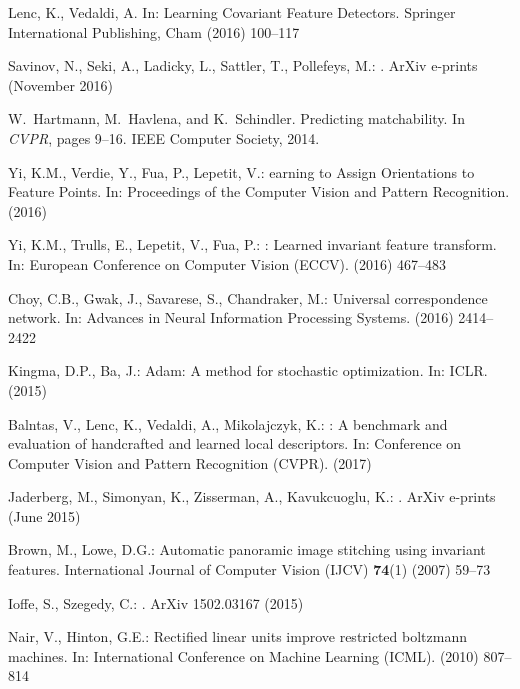 \documentclass[runningheads]{llncs}
\begin{document}
{\begin{thebibliography}{10}
Lenc, K., Vedaldi, A.
\newblock In: Learning Covariant Feature Detectors. Springer International
  Publishing, Cham (2016)  100--117

{Savinov}, N., {Seki}, A., {Ladicky}, L., {Sattler}, T., {Pollefeys}, M.:
.
\newblock ArXiv e-prints (November 2016)


W.~Hartmann, M.~Havlena, and K.~Schindler.
\newblock Predicting matchability.
\newblock In {\em CVPR}, pages 9--16. IEEE Computer Society, 2014.

Yi, K.M., Verdie, Y., Fua, P., Lepetit, V.:
earning to {A}ssign {O}rientations to {F}eature {P}oints.
\newblock In: Proceedings of the {C}omputer {V}ision and {P}attern
  {R}ecognition. (2016)

Yi, K.M., Trulls, E., Lepetit, V., Fua, P.:
: Learned invariant feature transform.
\newblock In: European Conference on Computer Vision ({ECCV}). (2016)  467--483

Choy, C.B., Gwak, J., Savarese, S., Chandraker, M.:
\newblock Universal correspondence network.
\newblock In: Advances in Neural Information Processing Systems. (2016)
  2414--2422

Kingma, D.P., Ba, J.:
\newblock Adam: {A} method for stochastic optimization.
\newblock In: ICLR. (2015)

Balntas, V., Lenc, K., Vedaldi, A., Mikolajczyk, K.:
: A benchmark and evaluation of handcrafted and learned
  local descriptors.
\newblock In: Conference on Computer Vision and Pattern Recognition {(CVPR)}.
  (2017)

{Jaderberg}, M., {Simonyan}, K., {Zisserman}, A., {Kavukcuoglu}, K.:
.
\newblock ArXiv e-prints (June 2015)

Brown, M., Lowe, D.G.:
\newblock Automatic panoramic image stitching using invariant features.
\newblock International Journal of Computer Vision ({IJCV}) \textbf{74}(1)
  (2007)  59--73

Ioffe, S., Szegedy, C.:
.
\newblock ArXiv 1502.03167 (2015)

Nair, V., Hinton, G.E.:
\newblock Rectified linear units improve restricted boltzmann machines.
\newblock In: International Conference on Machine Learning {(ICML)}. (2010)
  807--814


\end{thebibliography}}
\end{document}
